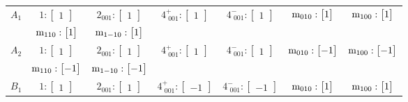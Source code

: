 \documentclass[fleqn,8pt,landscape]{jsarticle}
\begin{document}
\begin{longtable}{ccccccc}
$ A_{1} $ & $ 1:\begin{bmatrix} 1 \end{bmatrix} $ & $ 2{}_{001}:\begin{bmatrix} 1 \end{bmatrix} $ & $ 4^{+}_{\,\,001}:\begin{bmatrix} 1 \end{bmatrix} $ & $ 4^{-}_{\,\,001}:\begin{bmatrix} 1 \end{bmatrix} $ & $ {\rm m}_{010}:\begin{bmatrix} 1 \end{bmatrix} $ & $ {\rm m}_{100}:\begin{bmatrix} 1 \end{bmatrix} $ \\
& $ {\rm m}_{110}:\begin{bmatrix} 1 \end{bmatrix} $ & $ {\rm m}_{1-10}:\begin{bmatrix} 1 \end{bmatrix} $ & $  $ & $  $ & $  $ & $  $ \\ \hline
$ A_{2} $ & $ 1:\begin{bmatrix} 1 \end{bmatrix} $ & $ 2{}_{001}:\begin{bmatrix} 1 \end{bmatrix} $ & $ 4^{+}_{\,\,001}:\begin{bmatrix} 1 \end{bmatrix} $ & $ 4^{-}_{\,\,001}:\begin{bmatrix} 1 \end{bmatrix} $ & $ {\rm m}_{010}:\begin{bmatrix} -1 \end{bmatrix} $ & $ {\rm m}_{100}:\begin{bmatrix} -1 \end{bmatrix} $ \\
& $ {\rm m}_{110}:\begin{bmatrix} -1 \end{bmatrix} $ & $ {\rm m}_{1-10}:\begin{bmatrix} -1 \end{bmatrix} $ & $  $ & $  $ & $  $ & $  $ \\ \hline
$ B_{1} $ & $ 1:\begin{bmatrix} 1 \end{bmatrix} $ & $ 2{}_{001}:\begin{bmatrix} 1 \end{bmatrix} $ & $ 4^{+}_{\,\,001}:\begin{bmatrix} -1 \end{bmatrix} $ & $ 4^{-}_{\,\,001}:\begin{bmatrix} -1 \end{bmatrix} $ & $ {\rm m}_{010}:\begin{bmatrix} 1 \end{bmatrix} $ & $ {\rm m}_{100}:\begin{bmatrix} 1 \end{bmatrix} $ \\

\end{longtable}
\end{document}
